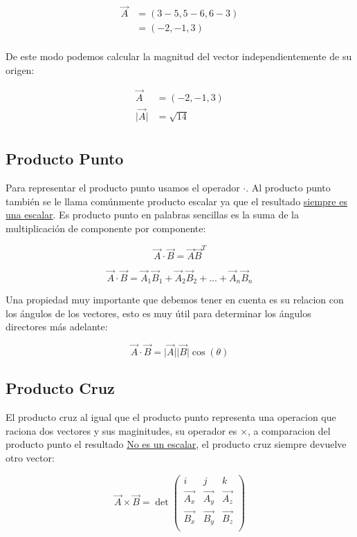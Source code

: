 \documentclass{article}
\begin{document}
\[ \begin{aligned}
\vec{A} &= (3-5,5-6,6-3) \\
~ &= (-2,-1,3) \\
\end{aligned} \]

De este modo podemos calcular la magnitud del vector independientemente de su origen:

\[ \begin{aligned}
\vec{A} &= (-2,-1,3) \\
\vert\vec{A}\vert &= \sqrt{14} \\
\end{aligned} \]

\subsection{Producto Punto}
\label{sec:org5529869}
Para representar el producto punto usamos el operador \(\cdot\). Al producto punto también se le llama comúnmente producto escalar ya que el resultado \uline{siempre es una escalar}. Es producto punto en palabras sencillas es la suma de la multiplicación de componente por componente:

\[
\vec{A} \cdot \vec{B} = \vec{A}\vec{B}^T
\]

\[
\vec{A} \cdot \vec{B} = \vec{A}_1 \vec{B}_1 + \vec{A}_2 \vec{B}_2 + ... + \vec{A}_n \vec{B}_n
\]

Una propiedad muy importante que debemos tener en cuenta es su relacion con los ángulos de los vectores, esto es muy útil para determinar los ángulos directores más adelante:

\[
 \vec{A}\cdot\vec{B} = \vert\vec{A}\vert\vert\vec{B}\vert \cos(\theta)
\]

\subsection{Producto Cruz}
\label{sec:orgd9ffb6b}
El producto cruz al igual que el producto punto representa una operacion que raciona dos vectores y sus maginitudes, su operador es \(\times\), a comparacion del producto punto el resultado \uline{No es un escalar}, el producto cruz siempre devuelve otro vector:

\[
\vec{A} \times \vec{B} = \det\begin{pmatrix}
       i    &      j    &     k    \\
  \vec{A_x} & \vec{A_y} & \vec{A_z}\\
  \vec{B_x} & \vec{B_y} & \vec{B_z}\\
\end{pmatrix}
\] 
\end{document}
